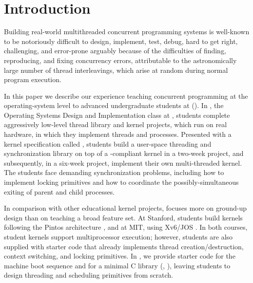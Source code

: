 \section{Introduction}
\label{sec:intro}

Building real-world multithreaded concurrent programming systems is well-known to be notoriously difficult to design, implement, test, debug, hard to get right, challenging, and error-prone arguably because of the difficulties of finding, reproducing, and fixing concurrency errors, attributable to the astronomically large number of thread interleavings, which arise at random during normal program execution.

In this paper we describe our experience teaching concurrent programming at the operating-system level to advanced undergraduate students at \carnegiemellon (\cmu).
In \fourten, the Operating Systems Design and Implementation class at \cmu,
students complete aggressively low-level thread library and kernel projects,
which run on real hardware,
in which they implement threads and processes.
Presented with a kernel specification called \pebbles%
, students build a user-space threading and synchronization library on top of a \pebbles-compliant kernel in a two-week project, and subsequently, in a six-week project, implement their own multi-threaded kernel.
The students face demanding synchronization problems, including how to implement locking primitives and how to coordinate the possibly-simultaneous exiting of parent and child processes.

In comparison with other educational kernel projects,
\pebbles focuses more on ground-up design than on teaching a broad feature set.
At Stanford, students build kernels following the Pintos architecture \cite{pintos}, and at MIT, using Xv6/JOS \cite{xv6}.
In both courses, student kernels support multiprocessor execution;
however, students are also supplied with starter code that already implements thread creation/destruction, context switching, and locking primitives.
In \fourten, we provide starter code for the machine boot sequence and for a minimal C library (, ), leaving students to design threading and scheduling primitives from scratch.

